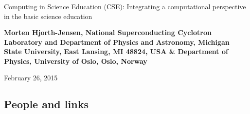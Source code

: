 \documentclass[%
twoside,                 %
final,                   %
10pt]{article}
\begin{document}




\thispagestyle{empty}

\begin{center}
{\LARGE\bf
\begin{spacing}{1.25}
Computing in Science Education (CSE): Integrating a computational perspective in the basic science education
\end{spacing}
}
\end{center}


\begin{center}
{\bf Morten Hjorth-Jensen, National Superconducting Cyclotron Laboratory and Department of Physics and Astronomy, Michigan State University, East Lansing, MI 48824, USA {\&} Department of Physics, University of Oslo, Oslo, Norway${}^{}$} \\ [0mm]
\end{center}

    \begin{center}
\end{center}
    

\begin{center} %
February 26, 2015
\end{center}

\vspace{1cm}


\subsection*{People and links}

\end{document}
